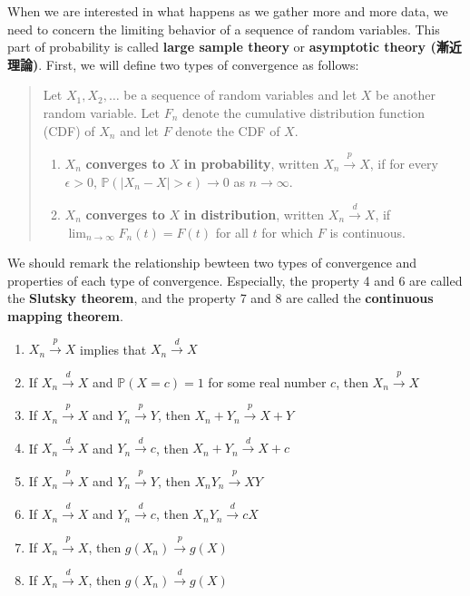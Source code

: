 \documentclass[
  12pt,
]{article}
\providecommand{\tightlist}{%
  \setlength{\itemsep}{0pt}\setlength{\parskip}{0pt}}
\begin{document}
When we are interested in what happens as we gather more and more data,
we need to concern the limiting behavior of a sequence of random variables.
This part of probability is called \textbf{large sample theory} or \textbf{asymptotic theory (漸近理論)}.
First, we will define two types of convergence as follows:

\begin{quote}
Let \(X_1, X_2, \ldots\) be a sequence of random variables and let \(X\) be another random variable. Let \(F_n\) denote the cumulative distribution function (CDF) of \(X_n\) and let \(F\) denote the CDF of \(X\).

\begin{enumerate}
\def\labelenumi{\arabic{enumi}.}
\tightlist
\item
  \(X_n\) \textbf{converges to} \(X\) \textbf{in probability}, written \(X_n \stackrel{p}{\to} X\), if for every \(\epsilon > 0\), \(\mathbb{P}(|X_n - X|> \epsilon) \to 0\) as \(n \to \infty\).
\item
  \(X_n\) \textbf{converges to} \(X\) \textbf{in distribution}, written \(X_n \stackrel{d}{\to} X\), if \(\lim_{n\to\infty} F_n(t) = F(t)\) for all \(t\) for which \(F\) is continuous.
\end{enumerate}
\end{quote}

We should remark the relationship bewteen two types of convergence and properties of each type of convergence.
Especially, the property 4 and 6 are called the \textbf{Slutsky theorem},
and the property 7 and 8 are called the \textbf{continuous mapping theorem}.

\begin{enumerate}
\def\labelenumi{\arabic{enumi}.}
\tightlist
\item
  \(X_n \stackrel{p}{\to} X\) implies that \(X_n \stackrel{d}{\to} X\)
\item
  If \(X_n \stackrel{d}{\to} X\) and \(\mathbb{P}(X = c) = 1\) for some real number \(c\), then \(X_n \stackrel{p}{\to} X\)
\item
  If \(X_n \stackrel{p}{\to} X\) and \(Y_n \stackrel{p}{\to} Y\), then \(X_n + Y_n \stackrel{p}{\to} X + Y\)
\item
  If \(X_n \stackrel{d}{\to} X\) and \(Y_n \stackrel{d}{\to} c\), then \(X_n + Y_n \stackrel{d}{\to} X + c\)
\item
  If \(X_n \stackrel{p}{\to} X\) and \(Y_n \stackrel{p}{\to} Y\), then \(X_n Y_n \stackrel{p}{\to} XY\)
\item
  If \(X_n \stackrel{d}{\to} X\) and \(Y_n \stackrel{d}{\to} c\), then \(X_n Y_n \stackrel{d}{\to} cX\)
\item
  If \(X_n \stackrel{p}{\to} X\), then \(g(X_n) \stackrel{p}{\to} g(X)\)
\item
  If \(X_n \stackrel{d}{\to} X\), then \(g(X_n) \stackrel{d}{\to} g(X)\)
\end{enumerate}
\end{document}
